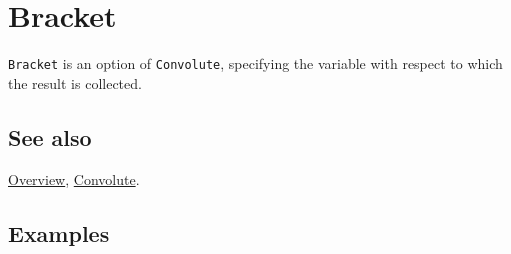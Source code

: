 \documentclass[../FeynCalcManual.tex]{subfiles}
\begin{document}
\hypertarget{bracket}{%
\section{Bracket}\label{bracket}}

\texttt{Bracket} is an option of \texttt{Convolute}, specifying the
variable with respect to which the result is collected.

\subsection{See also}

\hyperlink{toc}{Overview}, \hyperlink{convolute}{Convolute}.

\subsection{Examples}
\end{document}
